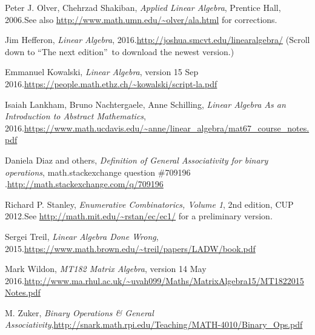 \documentclass[numbers=enddot,12pt,final,onecolumn,notitlepage]{scrartcl}%
\theoremstyle{definition}
\begin{document}
\begin{thebibliography}{9999999999}
Peter J. Olver, Chehrzad Shakiban, \textit{Applied
Linear Algebra}, Prentice Hall, 2006.\newline See also
\url{http://www.math.umn.edu/~olver/ala.html} for corrections.

Jim Hefferon, \textit{Linear Algebra},
2016.\newline\url{http://joshua.smcvt.edu/linearalgebra/} (Scroll down to
\textquotedblleft The next edition\textquotedblright\ to download the newest version.)

Emmanuel Kowalski, \textit{Linear Algebra},
version 15 Sep 2016.\newline\url{https://people.math.ethz.ch/~kowalski/script-la.pdf}

Isaiah Lankham, Bruno Nachtergaele, Anne
Schilling, \textit{Linear Algebra As an Introduction to Abstract Mathematics},
2016.\newline\url{https://www.math.ucdavis.edu/~anne/linear_algebra/mat67_course_notes.pdf}

Daniela Diaz and others, \textit{Definition of
General Associativity for binary operations}, math.stackexchange question
\#709196 .\newline\url{http://math.stackexchange.com/q/709196}

Richard P. Stanley, \textit{Enumerative
Combinatorics, Volume 1}, 2nd edition, CUP 2012.\newline See
\url{http://math.mit.edu/~rstan/ec/ec1/} for a preliminary version.

Sergei Treil, \textit{Linear Algebra Done Wrong},
2015.\newline\url{https://www.math.brown.edu/~treil/papers/LADW/book.pdf}

Mark Wildon, \textit{MT182 Matrix Algebra},
version 14 May 2016.\newline\url{http://www.ma.rhul.ac.uk/~uvah099/Maths/MatrixAlgebra15/MT1822015Notes.pdf}

M. Zuker, \textit{Binary Operations \& General
Associativity},\newline\url{http://snark.math.rpi.edu/Teaching/MATH-4010/Binary_Ops.pdf}
\end{thebibliography}
\end{document}

